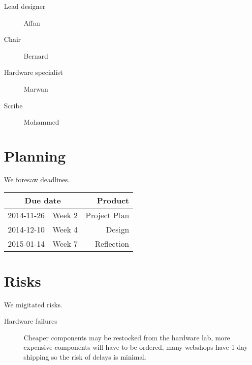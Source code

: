 \documentclass[twoside,a4paper,11pt,titlepage]{report}
\begin{document}
\begin{description}
	\item[Lead designer] Affan
	\item[Chair] Bernard
	\item[Hardware specialist] Marwan
	\item[Scribe] Mohammed
\end{description}
\chapter{Planning}
We foresaw deadlines.

\begin{tabular}[hbp]{llr}
\hline
\multicolumn{2}{c}{Due date} & Product \\
\hline
2014-11-26 & Week 2 & Project Plan \\
2014-12-10 & Week 4 & Design \\
2015-01-14 & Week 7 & Reflection \\
\hline
\end{tabular}
\chapter{Risks}
We migitated risks.

\begin{description}
	\item [Hardware failures] Cheaper components may be restocked from the hardware lab, more expensive components will have to be ordered, many webshops have 1-day shipping so the risk of delays is minimal.
\end{description}
\end{document}
